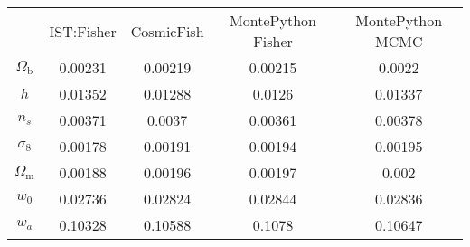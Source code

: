 \begin{table}
\centering
\begin{tabular}{|c|c|c|c|c|}
 & IST:Fisher & CosmicFish & MontePython Fisher & MontePython MCMC \\
$\Omega_\mathrm{b}$ & 0.00231 & 0.00219 & 0.00215 & 0.0022 \\
$h$ & 0.01352 & 0.01288 & 0.0126 & 0.01337 \\
$n_s$ & 0.00371 & 0.0037 & 0.00361 & 0.00378 \\
$\sigma_8$ & 0.00178 & 0.00191 & 0.00194 & 0.00195 \\
$\Omega_\mathrm{m}$ & 0.00188 & 0.00196 & 0.00197 & 0.002 \\
$w_0$ & 0.02736 & 0.02824 & 0.02844 & 0.02836 \\
$w_a$ & 0.10328 & 0.10588 & 0.1078 & 0.10647 \\
\end{tabular}
\end{table}
